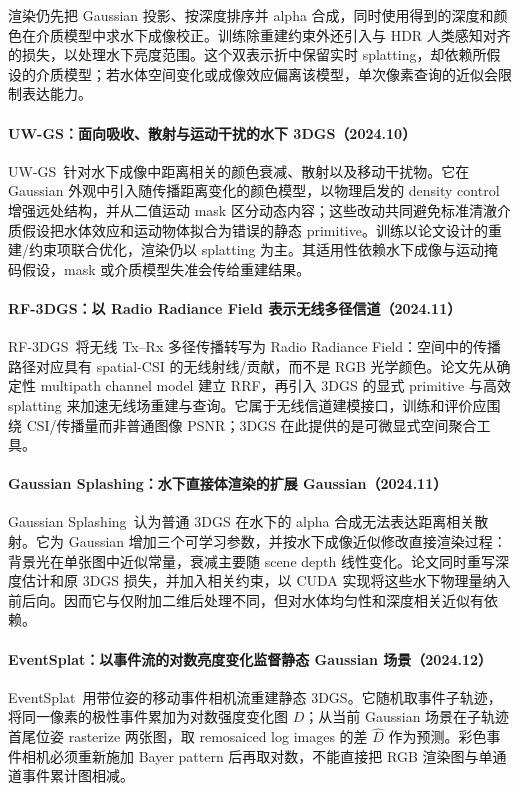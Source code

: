 渲染仍先把 Gaussian 投影、按深度排序并 alpha 合成，同时使用得到的深度和颜色在介质模型中求水下成像校正。训练除重建约束外还引入与 HDR 人类感知对齐的损失，以处理水下亮度范围。这个双表示折中保留实时 splatting，却依赖所假设的介质模型；若水体空间变化或成像效应偏离该模型，单次像素查询的近似会限制表达能力。


\paragraph{UW-GS：面向吸收、散射与运动干扰的水下 3DGS（2024.10）}
UW-GS~\cite{2410_01517}针对水下成像中距离相关的颜色衰减、散射以及移动干扰物。它在 Gaussian 外观中引入随传播距离变化的颜色模型，以物理启发的 density control 增强远处结构，并从二值运动 mask 区分动态内容；这些改动共同避免标准清澈介质假设把水体效应和运动物体拟合为错误的静态 primitive。训练以论文设计的重建/约束项联合优化，渲染仍以 splatting 为主。其适用性依赖水下成像与运动掩码假设，mask 或介质模型失准会传给重建结果。


\paragraph{RF-3DGS：以 Radio Radiance Field 表示无线多径信道（2024.11）}
RF-3DGS~\cite{2411_19420}将无线 Tx--Rx 多径传播转写为 Radio Radiance Field：空间中的传播路径对应具有 spatial-CSI 的无线射线/贡献，而不是 RGB 光学颜色。论文先从确定性 multipath channel model 建立 RRF，再引入 3DGS 的显式 primitive 与高效 splatting 来加速无线场重建与查询。它属于无线信道建模接口，训练和评价应围绕 CSI/传播量而非普通图像 PSNR；3DGS 在此提供的是可微显式空间聚合工具。


\paragraph{Gaussian Splashing：水下直接体渲染的扩展 Gaussian（2024.11）}
Gaussian Splashing~\cite{2411_19588}认为普通 3DGS 在水下的 alpha 合成无法表达距离相关散射。它为 Gaussian 增加三个可学习参数，并按水下成像近似修改直接渲染过程：背景光在单张图中近似常量，衰减主要随 scene depth 线性变化。论文同时重写深度估计和原 3DGS 损失，并加入相关约束，以 CUDA 实现将这些水下物理量纳入前后向。因而它与仅附加二维后处理不同，但对水体均匀性和深度相关近似有依赖。


\paragraph{EventSplat：以事件流的对数亮度变化监督静态 Gaussian 场景（2024.12）}
EventSplat~\cite{2412_07293}用带位姿的移动事件相机流重建静态 3DGS。它随机取事件子轨迹，将同一像素的极性事件累加为对数强度变化图 $D$；从当前 Gaussian 场景在子轨迹首尾位姿 rasterize 两张图，取 remosaiced log images 的差 $\hat D$ 作为预测。彩色事件相机必须重新施加 Bayer pattern 后再取对数，不能直接把 RGB 渲染图与单通道事件累计图相减。

